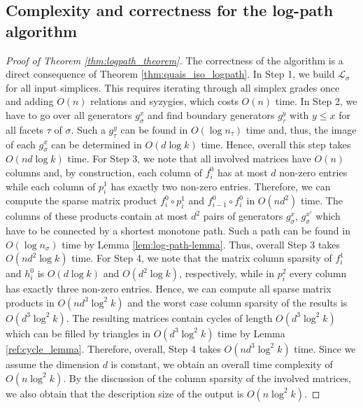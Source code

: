 \documentclass[11pt]{article}
\begin{document}
\subsection{Complexity and correctness for the log-path algorithm} \label{app:log_path_algo}
%
\logpathalgo*
%
\begin{proof}[Proof of Theorem \ref{thm:logpath_theorem}]
The correctness of the algorithm is a direct consequence of Theorem \ref{thm:quais_iso_logpath}. In Step 1, we build $\mathcal{L}_\sigma$ for all input simplices. This requires iterating through all simplex grades once and adding $O(n)$ relations and syzygies, which costs $O(n)$ time. In Step 2, we have to go over all generators $g_\sigma^x$ and find boundary generators $g_\tau^y$ with $y\leq x$ for all facets $\tau$ of $\sigma$. Such a $g_\tau^y$ can be found in $O(\log n_\tau)$ time and, thus, the image of each $g_\sigma^x$ can be determined in $O(d\log k)$ time. Hence, overall this step takes $O(nd\log k)$ time. For Step 3, we note that all involved matrices have $O(n)$ columns and, by construction, each column of $f^0_i$ has at most $d$ non-zero entries while each column of $p^1_i$ has exactly two non-zero entries. Therefore, we can compute the sparse matrix product $f^0_i\circ p^1_i$ and $f^0_{i-1}\circ f^0_i$ in $O(nd^2)$ time. The columns of these products contain at most $d^2$ pairs of generators $g^x_\sigma$, $g_\sigma^{x'}$ which have to be connected by a shortest monotone path. Such a path can be found in $O(\log n_\sigma)$ time by Lemma \ref{lem:log-path-lemma}. Thus, overall Step 3 takes $O(nd^2\log k)$ time. For Step 4, we note that the matrix column sparsity of $f^1_i$ and $h^0_i$ is $O(d\log k)$ and $O(d^2\log k)$, respectively, while in $p^2_i$ every column has exactly three non-zero entries. Hence, we can compute all sparse matrix products in $O(nd^3\log^2 k)$ and the worst case column sparsity of the results is $O(d^3\log^2k)$. The resulting matrices contain cycles of length $O(d^3\log^2k)$ which can be filled by triangles in $O(d^3\log^2k)$ time by Lemma \ref{ref:cycle_lemma}. Therefore, overall, Step 4 takes $O(nd^3\log^2k)$ time. Since we assume the dimension $d$ is constant, we obtain an overall time complexity of $O(n\log^2 k)$. By the discussion of the column sparsity of the involved matrices, we also obtain that the description size of the output is $O(n\log^2 k)$.
\end{proof}
%



\end{document}

